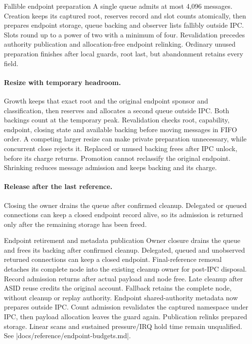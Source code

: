 \begin{implementationdetail}{Fallible endpoint preparation}
A single queue admits at most 4,096 messages. Creation keeps its captured
root, reserves record and slot counts atomically, then prepares endpoint storage,
queue backing and observer lists fallibly outside IPC. Slots round up to a
power of two with a minimum of four. Revalidation precedes authority publication
and allocation-free endpoint relinking. Ordinary unused preparation finishes
after local guards, root last, but abandonment retains every field.
\end{implementationdetail}

\paragraph*{Resize with temporary headroom.}

Growth keeps that exact root and the original endpoint sponsor and
classification, then reserves and allocates a second queue outside IPC. Both
backings count at the temporary peak. Revalidation checks root, capability,
endpoint, closing state and available backing before moving messages in FIFO
order. A competing larger resize can make private preparation unnecessary, while
concurrent close rejects it. Replaced or unused backing frees after IPC unlock,
before its charge returns. Promotion cannot reclassify the original endpoint.
Shrinking reduces message admission and keeps backing and its charge.

\paragraph*{Release after the last reference.}

Closing the owner drains the queue after confirmed cleanup. Delegated or queued
connections can keep a closed endpoint record alive, so its admission is returned
only after the remaining storage has been freed.

\begin{implementationdetail}{Endpoint retirement and metadata publication}
Owner closure drains the queue and frees its backing after confirmed cleanup.
Delegated, queued and unobserved returned connections can keep a closed
endpoint. Final-reference removal detaches its complete node into the existing
cleanup owner for post-IPC disposal. Record admission returns after actual
payload and node free. Late cleanup after ASID reuse credits the original
account. Fallback retains the complete node, without cleanup or replay
authority. Endpoint shared-authority metadata now prepares outside IPC.
Count admission revalidates the captured namespace under IPC, then payload
allocation leaves the guard again. Publication relinks prepared storage. Linear
scans and sustained pressure/IRQ hold time remain unqualified. See
\repofile|docs/reference/endpoint-budgets.md|.
\end{implementationdetail}


